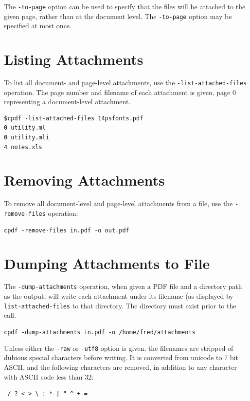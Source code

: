 \documentclass{book}
\begin{document}
  The \texttt{-to-page} option can be used to specify that the files will be attached to the given page, rather than at the document level. The \texttt{-to-page} option may be specified at most once. 

\section{Listing Attachments}
To list all document- and page-level attachments, use the \texttt{-list-attached-files} operation. The page number and filename of each attachment is given, page 0 representing a document-level attachment.
\begin{framed}
{\small\begin{verbatim}
$cpdf -list-attached-files 14psfonts.pdf
0 utility.ml
0 utility.mli
4 notes.xls
\end{verbatim}}
\end{framed}

  \section{Removing Attachments}
   To remove all document-level and page-level attachments from a file, use the \texttt{-remove-files} operation:
  \begin{framed}
    \noindent\small\verb!cpdf -remove-files in.pdf -o out.pdf!
  \end{framed}

\section{Dumping Attachments to File}

The \texttt{-dump-attachments} operation, when given a PDF file and a directory path as the output, will write each attachment under its filename (as displayed by \texttt{-list-attached-files} to that directory. The directory must exist prior to the call.

  \begin{framed}
    \noindent\small\verb!cpdf -dump-attachments in.pdf -o /home/fred/attachments!
  \end{framed}

\noindent  Unless either the \texttt{-raw} or \texttt{-utf8} option is given, the filenames are stripped of dubious special characters before writing. It is converted from unicode to 7 bit ASCII, and the following characters are removed, in addition to any character with ASCII code less than 32:
  \begin{framed}
  \centering
  \verb! / ? < > \ : * | " ^ + =!
  \end{framed}
\end{document}
